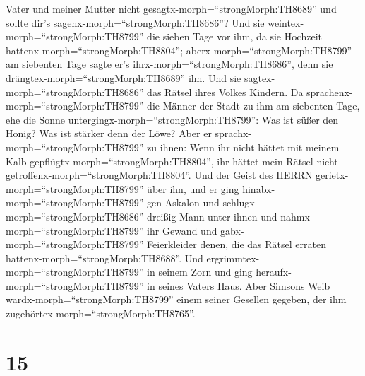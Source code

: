 Vater und meiner Mutter nicht gesagtx-morph=``strongMorph:TH8689'' und
sollte dir's sagenx-morph=``strongMorph:TH8686''?  Und sie
weintex-morph=``strongMorph:TH8799'' die sieben Tage vor ihm, da sie
Hochzeit hattenx-morph=``strongMorph:TH8804'';
aberx-morph=``strongMorph:TH8799'' am siebenten Tage sagte er's
ihrx-morph=``strongMorph:TH8686'', denn sie
drängtex-morph=``strongMorph:TH8689'' ihn. Und sie
sagtex-morph=``strongMorph:TH8686'' das Rätsel ihres Volkes Kindern.
 Da sprachenx-morph=``strongMorph:TH8799'' die Männer der
Stadt zu ihm am siebenten Tage, ehe die Sonne
untergingx-morph=``strongMorph:TH8799'': Was ist süßer den Honig? Was
ist stärker denn der Löwe? Aber er sprachx-morph=``strongMorph:TH8799''
zu ihnen: Wenn ihr nicht hättet mit meinem Kalb
gepflügtx-morph=``strongMorph:TH8804'', ihr hättet mein Rätsel nicht
getroffenx-morph=``strongMorph:TH8804''.  Und der Geist des
HERRN gerietx-morph=``strongMorph:TH8799'' über ihn, und er ging
hinabx-morph=``strongMorph:TH8799'' gen Askalon und
schlugx-morph=``strongMorph:TH8686'' dreißig Mann unter ihnen und
nahmx-morph=``strongMorph:TH8799'' ihr Gewand und
gabx-morph=``strongMorph:TH8799'' Feierkleider denen, die das Rätsel
erraten hattenx-morph=``strongMorph:TH8688''. Und
ergrimmtex-morph=``strongMorph:TH8799'' in seinem Zorn und ging
heraufx-morph=``strongMorph:TH8799'' in seines Vaters Haus.
 Aber Simsons Weib wardx-morph=``strongMorph:TH8799'' einem
seiner Gesellen gegeben, der ihm
zugehörtex-morph=``strongMorph:TH8765''.

\hypertarget{section-14}{%
\section{15}\label{section-14}}

